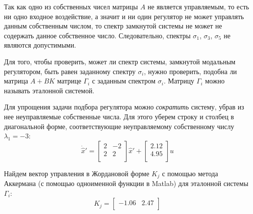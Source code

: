 Так как одно из собственных чисел матрицы $A$ не является управляемым, то есть ни одно входное воздействие, а значит и ни один регулятор 
не может управлять данным собственным числом, то спектр замкнутой системы не может не содержать данное собственное число. 
Следовательно, спектры $\sigma_1$, $\sigma_3$, $\sigma_5$ не являются допустимыми.

Для того, чтобы проверить, может ли спектр системы, замкнутой модальным регулятором, быть равен заданному спектру $\sigma_i$, 
нужно проверить, подобна ли матрица $A + BK$ матрице $\Gamma_i$ с заданным спектром $\sigma_i$.
Матрицу $\Gamma_i$ можно называть эталонной системой.

Для упрощения задачи подбора регулятора можно \textit{сократить} систему, убрав из нее неуправляемые собственные числа. 
Для этого уберем строку и столбец в диагональной форме, соответствующие неуправляемому собственному числу $\lambda_1 = -3$:
\begin{equation}
    \dot{\hat{x}}' =
     \begin{bmatrix}
        2  & -2 \\ 
        2  & 2 \\
    \end{bmatrix} \hat{x}' + 
    \begin{bmatrix}
        2.12 \\ 
        4.95 \\ 
    \end{bmatrix}u
\end{equation}

Найдем вектор управления в Жордановой форме $K_j$ с помощью метода Аккермана (с помощью одноименной функции в Matlab) для эталонной системы $\Gamma_i$: 
\begin{equation}
    K_j = \begin{bmatrix}
        -1.06  & 2.47 \\ 
    \end{bmatrix}
\end{equation}

